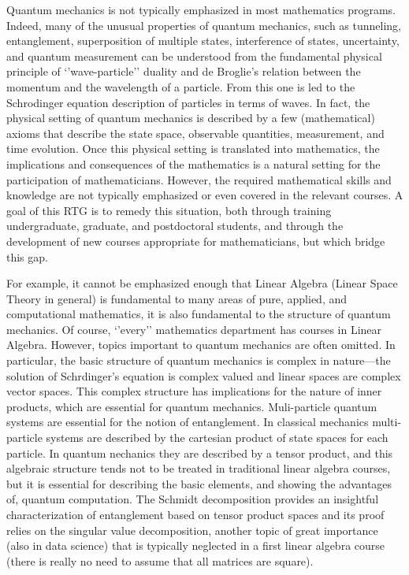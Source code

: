 \documentclass[11pt]{article}
\begin{document}
Quantum mechanics is not typically emphasized in most mathematics programs.  Indeed, many of the unusual properties of quantum mechanics, such as tunneling, entanglement, superposition of multiple states, interference of states, uncertainty, and quantum measurement can be understood from the fundamental physical principle of ‘’wave-particle’’ duality and de Broglie’s relation between the momentum and the wavelength of a particle.  From this one is led to the Schr\”odinger equation description of particles in terms of waves. In fact, the physical setting of quantum mechanics is described by a few (mathematical) axioms that describe the state space, observable quantities, measurement, and time evolution.  Once this physical setting is translated into mathematics, the implications and consequences of the mathematics is a natural setting for the participation of mathematicians. However, the required mathematical skills and knowledge are not typically emphasized or even covered in the relevant courses. A goal of this RTG is to remedy this situation, both through training undergraduate, graduate, and postdoctoral students, and through the development of new courses appropriate for mathematicians, but which bridge this gap.

For example, it cannot be emphasized enough that Linear Algebra (Linear Space Theory in general) is fundamental to many areas of pure, applied, and computational mathematics, it is also fundamental to the structure of quantum mechanics. Of course, ‘’every’’ mathematics department has courses in Linear Algebra. However, topics important to quantum mechanics are often omitted. In particular, the basic structure of quantum mechanics is complex in nature—the solution of Schrdinger’s equation is complex valued and linear spaces are complex vector spaces. This complex structure has implications for the nature of inner products, which are essential for quantum mechanics. Muli-particle quantum systems are essential for the notion of entanglement. In classical mechanics multi-particle systems are described by the cartesian product  of state spaces for each particle. In quantum nechanics they are described by a tensor product, and this algebraic structure tends not to be treated in traditional linear algebra courses, but it is essential for describing the basic elements, and showing the advantages of, quantum computation. The Schmidt decomposition provides an insightful characterization of entanglement based on tensor product spaces and its proof relies on the singular value decomposition, another topic of great importance (also in data science) that is typically neglected in a first linear algebra course (there is really no need to assume that all matrices are square).
\end{document}
